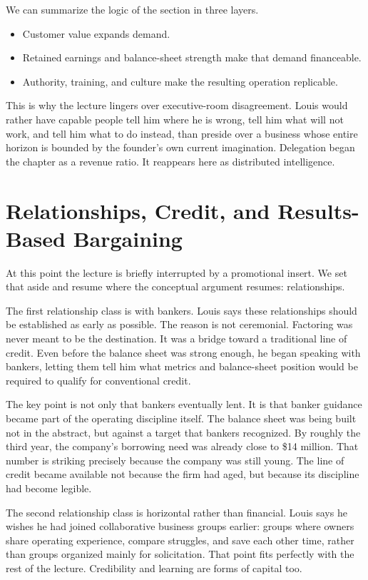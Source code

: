 We can summarize the logic of the section in three layers.
\begin{itemize}
\item Customer value expands demand.
\item Retained earnings and balance-sheet strength make that demand financeable.
\item Authority, training, and culture make the resulting operation replicable.
\end{itemize}

This is why the lecture lingers over executive-room disagreement. Louis would rather have capable people tell him where he is wrong, tell him what will not work, and tell him what to do instead, than preside over a business whose entire horizon is bounded by the founder's own current imagination. Delegation began the chapter as a revenue ratio. It reappears here as distributed intelligence.

\section{Relationships, Credit, and Results-Based Bargaining}

At this point the lecture is briefly interrupted by a promotional insert. We set that aside and resume where the conceptual argument resumes: relationships.

The first relationship class is with bankers. Louis says these relationships should be established as early as possible. The reason is not ceremonial. Factoring was never meant to be the destination. It was a bridge toward a traditional line of credit. Even before the balance sheet was strong enough, he began speaking with bankers, letting them tell him what metrics and balance-sheet position would be required to qualify for conventional credit.

The key point is not only that bankers eventually lent. It is that banker guidance became part of the operating discipline itself. The balance sheet was being built not in the abstract, but against a target that bankers recognized. By roughly the third year, the company's borrowing need was already close to \$14 million. That number is striking precisely because the company was still young. The line of credit became available not because the firm had aged, but because its discipline had become legible.

The second relationship class is horizontal rather than financial. Louis says he wishes he had joined collaborative business groups earlier: groups where owners share operating experience, compare struggles, and save each other time, rather than groups organized mainly for solicitation. That point fits perfectly with the rest of the lecture. Credibility and learning are forms of capital too.

